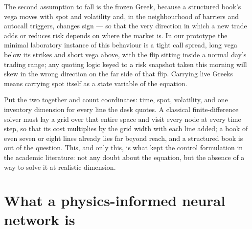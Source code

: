 \documentclass[11pt,a4paper]{article}
\begin{document}
The second assumption to fall is the frozen Greek, because a structured
book's vega moves with spot and volatility and, in the neighbourhood of
barriers and autocall triggers, changes sign --- so that the very
direction in which a new trade adds or reduces risk depends on where the
market is. In our prototype the minimal laboratory instance of this
behaviour is a tight call spread, long vega below its strikes and short
vega above, with the flip sitting inside a normal day's trading range;
any quoting logic keyed to a risk snapshot taken this morning will skew
in the wrong direction on the far side of that flip. Carrying live
Greeks means carrying spot itself as a state variable of the equation.

Put the two together and count coordinates: time, spot, volatility, and
one inventory dimension for every line the desk quotes. A classical
finite-difference solver must lay a grid over that entire space and
visit every node at every time step, so that its cost multiplies by the
grid width with each line added; a book of even seven or eight lines
already lies far beyond reach, and a structured book is out of the
question. This, and only this, is what kept the control formulation in
the academic literature: not any doubt about the equation, but the
absence of a way to solve it at realistic dimension.

\section{What a physics-informed neural network is}
\label{sec:pinn}
\end{document}
